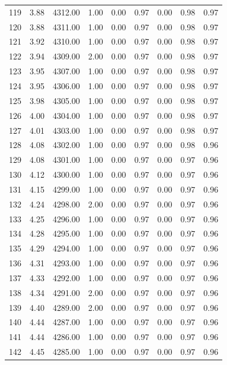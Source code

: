 \documentclass{article}\usepackage[]{graphicx}\usepackage[]{color}
\begin{document}
\begin{longtable}{rrrrrrrrr}
  119 & 3.88 & 4312.00 & 1.00 & 0.00 & 0.97 & 0.00 & 0.98 & 0.97 \\ 
  120 & 3.88 & 4311.00 & 1.00 & 0.00 & 0.97 & 0.00 & 0.98 & 0.97 \\ 
  121 & 3.92 & 4310.00 & 1.00 & 0.00 & 0.97 & 0.00 & 0.98 & 0.97 \\ 
  122 & 3.94 & 4309.00 & 2.00 & 0.00 & 0.97 & 0.00 & 0.98 & 0.97 \\ 
  123 & 3.95 & 4307.00 & 1.00 & 0.00 & 0.97 & 0.00 & 0.98 & 0.97 \\ 
  124 & 3.95 & 4306.00 & 1.00 & 0.00 & 0.97 & 0.00 & 0.98 & 0.97 \\ 
  125 & 3.98 & 4305.00 & 1.00 & 0.00 & 0.97 & 0.00 & 0.98 & 0.97 \\ 
  126 & 4.00 & 4304.00 & 1.00 & 0.00 & 0.97 & 0.00 & 0.98 & 0.97 \\ 
  127 & 4.01 & 4303.00 & 1.00 & 0.00 & 0.97 & 0.00 & 0.98 & 0.97 \\ 
  128 & 4.08 & 4302.00 & 1.00 & 0.00 & 0.97 & 0.00 & 0.98 & 0.96 \\ 
  129 & 4.08 & 4301.00 & 1.00 & 0.00 & 0.97 & 0.00 & 0.97 & 0.96 \\ 
  130 & 4.12 & 4300.00 & 1.00 & 0.00 & 0.97 & 0.00 & 0.97 & 0.96 \\ 
  131 & 4.15 & 4299.00 & 1.00 & 0.00 & 0.97 & 0.00 & 0.97 & 0.96 \\ 
  132 & 4.24 & 4298.00 & 2.00 & 0.00 & 0.97 & 0.00 & 0.97 & 0.96 \\ 
  133 & 4.25 & 4296.00 & 1.00 & 0.00 & 0.97 & 0.00 & 0.97 & 0.96 \\ 
  134 & 4.28 & 4295.00 & 1.00 & 0.00 & 0.97 & 0.00 & 0.97 & 0.96 \\ 
  135 & 4.29 & 4294.00 & 1.00 & 0.00 & 0.97 & 0.00 & 0.97 & 0.96 \\ 
  136 & 4.31 & 4293.00 & 1.00 & 0.00 & 0.97 & 0.00 & 0.97 & 0.96 \\ 
  137 & 4.33 & 4292.00 & 1.00 & 0.00 & 0.97 & 0.00 & 0.97 & 0.96 \\ 
  138 & 4.34 & 4291.00 & 2.00 & 0.00 & 0.97 & 0.00 & 0.97 & 0.96 \\ 
  139 & 4.40 & 4289.00 & 2.00 & 0.00 & 0.97 & 0.00 & 0.97 & 0.96 \\ 
  140 & 4.44 & 4287.00 & 1.00 & 0.00 & 0.97 & 0.00 & 0.97 & 0.96 \\ 
  141 & 4.44 & 4286.00 & 1.00 & 0.00 & 0.97 & 0.00 & 0.97 & 0.96 \\ 
  142 & 4.45 & 4285.00 & 1.00 & 0.00 & 0.97 & 0.00 & 0.97 & 0.96 \\ 

\end{longtable}
\end{document}

